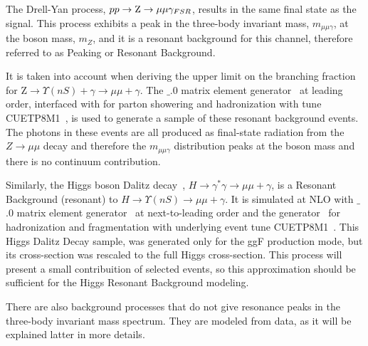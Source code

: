 The Drell-Yan process, $pp \rightarrow \mathrm{Z} \rightarrow \mu\mu \gamma_{FSR}$, results in the same final state as the signal. This process exhibits a peak in the three-body invariant mass, $m_{\mu\mu\gamma}$, at the \Z boson mass, $m_{Z}$, and it is a resonant background for this channel, therefore referred to as Peaking or Resonant Background. 

It is taken into account when deriving the upper limit on the branching fraction for Z$\rightarrow \Upsilon(nS) + \gamma \rightarrow \mu\mu + \gamma$. The  $\_$.0 matrix element generator~\cite{Alwall2014} at leading order, interfaced with  for parton showering and hadronization with tune CUETP8M1~\cite{Khachatryan:2015pea}, is used to generate a sample of these resonant background events. The photons in these events are all produced as final-state radiation from the $ Z \rightarrow \mu\mu$ decay and therefore the $m_{\mu\mu\gamma}$ distribution peaks at the \Z boson mass and there is no continuum contribution.  

Similarly, the Higgs boson Dalitz decay~\cite{PhysRevD.55.5647}, $H \rightarrow \gamma^{*} \gamma\rightarrow \mu\mu + \gamma$, is a Resonant Background (resonant) to $H \rightarrow \Upsilon(nS) \rightarrow \mu\mu + \gamma$. It is simulated at NLO with  $\_$.0 matrix element generator~\cite{Alwall2014} at next-to-leading order and the  generator~\cite{SJOSTRAND2008852,Sjostrand:2014zea} for hadronization and fragmentation with underlying event tune CUETP8M1~\cite{Khachatryan:2015pea}. This Higgs Dalitz Decay sample, was generated only for the ggF production mode, but its cross-section was rescaled to the full Higgs cross-section. This process will present a small contribuition of selected events, so this approximation should be sufficient for the Higgs Resonant Background modeling.

There are also background processes that do not give resonance peaks in the three-body invariant mass spectrum. They are modeled from data, as it will be explained latter in more details.
 
